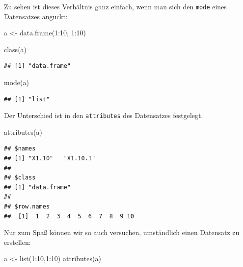 \documentclass[
]{book}
\newenvironment{Shaded}{\begin{snugshade}}{\end{snugshade}}
\newcommand{\DecValTok}[1]{\textcolor[rgb]{0.00,0.00,0.81}{#1}}
\newcommand{\FunctionTok}[1]{\textcolor[rgb]{0.00,0.00,0.00}{#1}}
\newcommand{\NormalTok}[1]{#1}
\newcommand{\OtherTok}[1]{\textcolor[rgb]{0.56,0.35,0.01}{#1}}
\newcommand{\SpecialCharTok}[1]{\textcolor[rgb]{0.00,0.00,0.00}{#1}}
\begin{document}
Zu sehen ist dieses Verhältnis ganz einfach, wenn man sich den \texttt{mode} eines Datensatzes anguckt:

\begin{Shaded}
\begin{Highlighting}[]
\NormalTok{a }\OtherTok{\textless{}{-}} \FunctionTok{data.frame}\NormalTok{(}\DecValTok{1}\SpecialCharTok{:}\DecValTok{10}\NormalTok{,}
                \DecValTok{1}\SpecialCharTok{:}\DecValTok{10}\NormalTok{)}

\FunctionTok{class}\NormalTok{(a)}
\end{Highlighting}
\end{Shaded}

\begin{verbatim}
## [1] "data.frame"
\end{verbatim}

\begin{Shaded}
\begin{Highlighting}[]
\FunctionTok{mode}\NormalTok{(a)}
\end{Highlighting}
\end{Shaded}

\begin{verbatim}
## [1] "list"
\end{verbatim}

Der Unterschied ist in den \texttt{attributes} des Datensatzes festgelegt.

\begin{Shaded}
\begin{Highlighting}[]
\FunctionTok{attributes}\NormalTok{(a)}
\end{Highlighting}
\end{Shaded}

\begin{verbatim}
## $names
## [1] "X1.10"   "X1.10.1"
## 
## $class
## [1] "data.frame"
## 
## $row.names
##  [1]  1  2  3  4  5  6  7  8  9 10
\end{verbatim}

Nur zum Spaß können wir so auch versuchen, umständlich einen Datensatz zu erstellen:

\begin{Shaded}
\begin{Highlighting}[]
\NormalTok{a }\OtherTok{\textless{}{-}} \FunctionTok{list}\NormalTok{(}\DecValTok{1}\SpecialCharTok{:}\DecValTok{10}\NormalTok{,}\DecValTok{1}\SpecialCharTok{:}\DecValTok{10}\NormalTok{)}
\FunctionTok{attributes}\NormalTok{(a)}
\end{Highlighting}
\end{Shaded}
\end{document}
